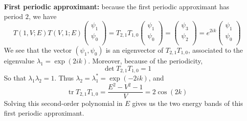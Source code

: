 \documentclass[11pt]{article}
\DeclareMathOperator{\tr}{tr}
\begin{document}
\textbf{First periodic approximant:} because the first periodic approximant has period $2$, we have
\begin{equation}
	T(1,V;E)T(V,1;E)
	\begin{pmatrix}
		\psi_1\\
		\psi_{0}\\
	\end{pmatrix} = T_{2,1}T_{1,0}
	\begin{pmatrix}
		\psi_1\\
		\psi_{0}\\
	\end{pmatrix} = 
	\begin{pmatrix}
		\psi_3\\
		\psi_{2}\\
	\end{pmatrix}
	= e^{2ik} 
	\begin{pmatrix}
		\psi_1\\
		\psi_{0}\\
	\end{pmatrix}
\end{equation}
We see that the vector $(\psi_1,\psi_0)$ is an eigenvector of $T_{2,1} T_{1,0}$, associated to the eigenvalue $\lambda_1 = \exp(2ik)$.
Moreover, because of the periodicity,
\begin{equation}
	\det T_{2,1}T_{1,0} = 1
\end{equation}
So that $\lambda_1 \lambda_2 = 1$. Thus $\lambda_2 = \lambda_1^* = \exp(-2ik)$, and
\begin{equation}
	\tr T_{2,1}T_{1,0} = \frac{E^2-V^2-1}{V} = 2 \cos(2 k)
\end{equation}
Solving this second-order polynomial in $E$ gives us the two energy bands of this first periodic approximant.
\end{document}
